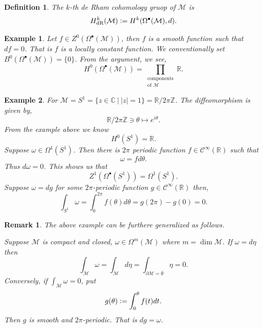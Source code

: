 \documentclass[8pt]{article}
\newtheorem{definition}{Definition}[section]
\newtheorem{remark}{Remark}[section]
\newtheorem{example}{Example}[section]
\DeclareMathOperator{\dR}{dR}
\newcommand{\defeq}{\vcentcolon=}
\newcommand{\R}[0]{\mathbb{R}}
\newcommand{\Z}[0]{\mathbb{Z}}
\newcommand{\C}[0]{\mathbb{C}}
\newcommand{\M}[0]{\mathcal{M}}
\newcommand{\cinf}[0]{\mathcal{C}^\infty}
\newcommand{\sep}[0]{\:|\:}
\begin{document}
\begin{definition}
  The $k$-th de Rham cohomology gruop of $\M$ is 
  \begin{equation*}
    H^k_{\dR}(\M) \defeq H^k(\Omega^\bullet(\M),d).
  \end{equation*}
\end{definition}

\begin{example}
  Let $f\in Z^0(\Omega^\bullet(\M))$, then $f$ is a smooth function such that $df=0$. That is $f$ is a locally constant function. We conventionally set $B^0(\Omega^\bullet(\M)) = \{0\}$. From the argument, we see,
  \begin{equation*}
    H^0(\Omega^\bullet(\M)) = \prod_{\substack{\text{components}\\\text{of $\M$}}}\R.
  \end{equation*}
\end{example}

\begin{example}
  For $\M = S^1 = \{z\in\C\sep \vert z\vert = 1\}=\R/2\pi\Z$. The diffeomorphism is given by,
  \begin{equation*}
    \R/2\pi\Z\ni \theta\mapsto e^{i\theta}.
  \end{equation*}
  From the example above we know 
  \begin{equation*}
    H^0(S^1) = \R.
  \end{equation*}
  \label{example_zeroth_cohomology_circle}
  Suppose $\omega\in\Omega^1(S^1)$. Then there is $2\pi$ periodic function $f\in\cinf(\R)$ such that 
  \begin{equation*}
    \omega = fd\theta.
  \end{equation*}
  Thus $d\omega = 0$. This shows us that 
  \begin{equation*}
    Z^1(\Omega^\bullet(S^1)) = \Omega^1(S^1).
  \end{equation*}
  Suppose $\omega = dg$ for some $2\pi$-periodic function $g\in\cinf(\R)$ then,
  \begin{equation*}
    \int_{S^1}\omega = \int_0^{2\pi}f(\theta)d\theta = g(2\pi)-g(0)=0.
  \end{equation*}
\end{example}

\begin{remark}
  The above example can be furthere generalized as follows. 
  \par Suppose $\M$ is compact and closed, $\omega\in\Omega^m(\M)$ where $m=\dim \M$. If $\omega = d\eta$ then 
  \begin{equation*}
    \int_\M\omega = \int_\M d\eta = \int_{\partial \M = \emptyset}\eta=0.
  \end{equation*}
  Conversely, if $\int_\M\omega = 0$, put 
  \begin{equation*}
    g(\theta) \defeq \int_0^\theta f(t)dt.
  \end{equation*}
  Then $g$ is smooth and $2\pi$-periodic. That is $dg = \omega$.
\end{remark}
\end{document}
